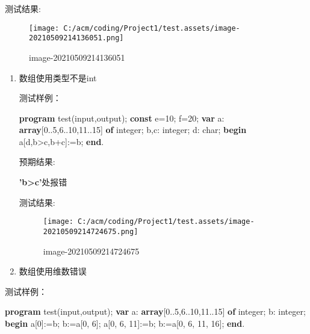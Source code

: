 \documentclass[]{ctexart}
\newenvironment{Shaded}{}{}
\newcommand{\DataTypeTok}[1]{\textcolor[rgb]{0.56,0.13,0.00}{#1}}
\newcommand{\DecValTok}[1]{\textcolor[rgb]{0.25,0.63,0.44}{#1}}
\newcommand{\KeywordTok}[1]{\textcolor[rgb]{0.00,0.44,0.13}{\textbf{#1}}}
\newcommand{\NormalTok}[1]{#1}
\begin{document}
\begin{enumerate}
  测试结果:

  \begin{figure}
  \centering
  \texttt{[image: C:/acm/coding/Project1/test.assets/image-20210509214136051.png]}
  \caption{image-20210509214136051}
  \end{figure}

  \begin{enumerate}
  \def\labelenumii{\arabic{enumii}.}
  \item
    数组使用类型不是int

    测试样例：

\begin{Shaded}
\begin{Highlighting}[]
\KeywordTok{program}\NormalTok{ test(input,output);  }
\KeywordTok{const}\NormalTok{ e=}\DecValTok{10}\NormalTok{;  }
\NormalTok{      f=}\DecValTok{20}\NormalTok{;  }
\KeywordTok{var}\NormalTok{ a: }\KeywordTok{array}\NormalTok{[}\DecValTok{0}\NormalTok{..}\DecValTok{5}\NormalTok{,}\DecValTok{6}\NormalTok{..}\DecValTok{10}\NormalTok{,}\DecValTok{11}\NormalTok{..}\DecValTok{15}\NormalTok{] }\KeywordTok{of} \DataTypeTok{integer}\NormalTok{;  }
\NormalTok{    b,c: }\DataTypeTok{integer}\NormalTok{;  }
\NormalTok{    d: }\DataTypeTok{char}\NormalTok{;  }
\KeywordTok{begin}  
\NormalTok{    a[d,b>c,b+c]:=b; }
\KeywordTok{end}\NormalTok{. }
\end{Highlighting}
\end{Shaded}

    预期结果:

    \textbf{'b\textgreater{}c'}处报错

    测试结果:

    \begin{figure}
    \centering
    \texttt{[image: C:/acm/coding/Project1/test.assets/image-20210509214724675.png]}
    \caption{image-20210509214724675}
    \end{figure}
  \item
    数组使用维数错误
  \end{enumerate}

  测试样例：

\begin{Shaded}
\begin{Highlighting}[]
\KeywordTok{program}\NormalTok{ test(input,output);  }
\KeywordTok{var}\NormalTok{ a: }\KeywordTok{array}\NormalTok{[}\DecValTok{0}\NormalTok{..}\DecValTok{5}\NormalTok{,}\DecValTok{6}\NormalTok{..}\DecValTok{10}\NormalTok{,}\DecValTok{11}\NormalTok{..}\DecValTok{15}\NormalTok{] }\KeywordTok{of} \DataTypeTok{integer}\NormalTok{;  }
\NormalTok{    b: }\DataTypeTok{integer}\NormalTok{;  }
\KeywordTok{begin}  
\NormalTok{    a[}\DecValTok{0}\NormalTok{]:=b;  }
\NormalTok{    b:=a[}\DecValTok{0}\NormalTok{, }\DecValTok{6}\NormalTok{];  }
\NormalTok{    a[}\DecValTok{0}\NormalTok{, }\DecValTok{6}\NormalTok{, }\DecValTok{11}\NormalTok{]:=b;  }
\NormalTok{    b:=a[}\DecValTok{0}\NormalTok{, }\DecValTok{6}\NormalTok{, }\DecValTok{11}\NormalTok{, }\DecValTok{16}\NormalTok{];  }
\KeywordTok{end}\NormalTok{.  }
\end{Highlighting}
\end{Shaded}


\end{enumerate}
\end{document}
